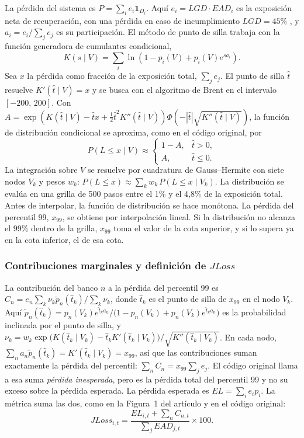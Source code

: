 La pérdida del sistema es $P=\sum_i e_i\mathbf 1_{D_i}$. Aquí $e_i=LGD\cdot EAD_i$ es la exposición neta de recuperación, con una pérdida en caso de incumplimiento $LGD=45\%$ \citep{BIS2006}, y $a_i=e_i/\sum_j e_j$ es su participación. El método de punto de silla \citep{MartinThompsonBrowne2001} trabaja con la función generadora de cumulantes condicional,
\[ K(s\mid V)=\sum_i\ln\!\left(1-p_i(V)+p_i(V)e^{s a_i}\right). \]
Sea $x$ la pérdida como fracción de la exposición total, $\sum_j e_j$. El punto de silla $\hat t$ resuelve $K'(\hat t\mid V)=x$ y se busca con el algoritmo de Brent en el intervalo $[-200,\,200]$. Con $A=\exp\!\left(K(\hat t\mid V)-\hat t x+\tfrac12\hat t^2K''(\hat t\mid V)\right)\Phi\!\left(-|\hat t|\sqrt{K''(\hat t\mid V)}\right)$, la función de distribución condicional se aproxima, como en el código original, por
\[ P(L\le x\mid V)\approx\begin{cases}1-A, & \hat t>0,\\ A, & \hat t\le 0.\end{cases} \]
La integración sobre $V$ se resuelve por cuadratura de Gauss--Hermite con siete nodos $V_k$ y pesos $w_k$: $P(L\le x)\approx\sum_k w_k\,P(L\le x\mid V_k)$. La distribución se evalúa en una grilla de 500 pasos entre el 1\% y el 4,8\% de la exposición total. Antes de interpolar, la función de distribución se hace monótona. La pérdida del percentil 99, $x_{99}$, se obtiene por interpolación lineal. Si la distribución no alcanza el 99\% dentro de la grilla, $x_{99}$ toma el valor de la cota superior, y si lo supera ya en la cota inferior, el de esa cota.

\subsubsection{Contribuciones marginales y definición de \texorpdfstring{$JLoss$}{JLoss}}

La contribución del banco $n$ a la pérdida del percentil 99 es $C_n=e_n\sum_k\nu_k\tilde p_n(\hat t_k)/\sum_k\nu_k$, donde $\hat t_k$ es el punto de silla de $x_{99}$ en el nodo $V_k$. Aquí $\tilde p_n(\hat t_k)=p_n(V_k)e^{\hat t_k a_n}/\bigl(1-p_n(V_k)+p_n(V_k)e^{\hat t_k a_n}\bigr)$ es la probabilidad inclinada por el punto de silla, y $\nu_k=w_k\exp\!\bigl(K(\hat t_k\mid V_k)-\hat t_kK'(\hat t_k\mid V_k)\bigr)/\sqrt{K''(\hat t_k\mid V_k)}$. En cada nodo, $\sum_n a_n\tilde p_n(\hat t_k)=K'(\hat t_k\mid V_k)=x_{99}$, así que las contribuciones suman exactamente la pérdida del percentil: $\sum_nC_n=x_{99}\sum_je_j$. El código original llama a esa suma \emph{pérdida inesperada}, pero es la pérdida total del percentil 99 y no su exceso sobre la pérdida esperada. La pérdida esperada es $EL=\sum_ie_ip_i$. La métrica suma las dos, como en la Figura~1 del artículo y en el código original:
\[ JLoss_{i,t}=\frac{EL_{i,t}+\sum_nC_{n,t}}{\sum_jEAD_{j,t}}\times100. \]

